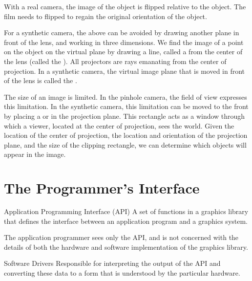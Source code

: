 \documentclass[\main/notes.tex]{subfiles}
\begin{document}
      With a real camera, the image of the object is flipped relative to the object.
      The film needs to flipped to regain the original orientation of the object.

      For a synthetic camera, the above can be avoided by
      drawing another plane in front of the lens, and
      working in three dimensions.
      We find the image of a point on the object on the virtual plane
      by drawing a line, called a 
      from the center of the lens (called the ).
      All projectors are rays emanating from the center of projection.
      In a synthetic camera, the virtual image plane that is moved in front of the lens
      is called the .

      The size of an image is limited.
      In the pinhole camera, the field of view expresses this limitation.
      In the synthetic camera, this limitation can be moved to the front by
      placing a  or 
      in the projection plane.
      This rectangle acts as a window through which a viewer,
      located at the center of projection,
      sees the world.
      Given the location of the center of projection,
      the location and orientation of the projection plane, and
      the size of the clipping rectangle,
      we can determine which objects will appear in the image.

    \pagebreak

    \section{The Programmer's Interface}
      \begin{definition}{Application Programming Interface (API)}
        A set of functions in a graphics library that defines the interface
        between an application program and a graphics system.
      \end{definition}

      The application programmer sees only the API,
      and is not concerned with the details of both the hardware and software implementation
      of the graphics library.

      \begin{definition}{Software Drivers}
        Responsible for interpreting the output of the API
        and converting these data to a form that is understood by the particular hardware.
      \end{definition}
\end{document}
